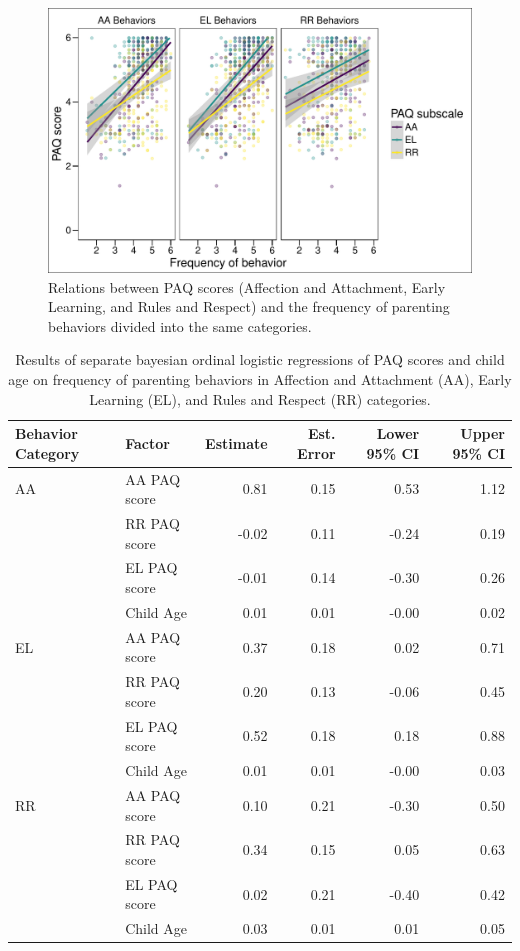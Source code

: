 \documentclass[floatsintext,man]{apa6}
\theoremstyle{definition}
\theoremstyle{definition}
\theoremstyle{definition}
\theoremstyle{remark}
\begin{document}
\begin{figure}
\centering
\includegraphics{PAQ_paper_files/figure-latex/behavepaq-1.pdf}
\caption{\label{fig:behavepaq}Relations between PAQ scores (Affection and
Attachment, Early Learning, and Rules and Respect) and the frequency of
parenting behaviors divided into the same categories.}
\end{figure}

\begin{table}[h]
\centering
\caption{Results of separate bayesian ordinal logistic regressions of PAQ scores and child age on frequency of parenting behaviors in Affection and Attachment (AA), Early Learning (EL), and Rules and Respect (RR) categories.} 
\label{tab:behavetab}
\begin{tabular}{llrrrr}
  \hline
Behavior Category & Factor & Estimate & Est. Error & Lower 95\% CI & Upper 95\% CI \\ 
  \hline
AA & AA PAQ score & 0.81 & 0.15 & 0.53 & 1.12 \\ 
   & RR PAQ score & -0.02 & 0.11 & -0.24 & 0.19 \\ 
   & EL PAQ score & -0.01 & 0.14 & -0.30 & 0.26 \\ 
   & Child Age & 0.01 & 0.01 & -0.00 & 0.02 \\ 
   \hline
EL & AA PAQ score & 0.37 & 0.18 & 0.02 & 0.71 \\ 
   & RR PAQ score & 0.20 & 0.13 & -0.06 & 0.45 \\ 
   & EL PAQ score & 0.52 & 0.18 & 0.18 & 0.88 \\ 
   & Child Age & 0.01 & 0.01 & -0.00 & 0.03 \\ 
   \hline
RR & AA PAQ score & 0.10 & 0.21 & -0.30 & 0.50 \\ 
   & RR PAQ score & 0.34 & 0.15 & 0.05 & 0.63 \\ 
   & EL PAQ score & 0.02 & 0.21 & -0.40 & 0.42 \\ 
   & Child Age & 0.03 & 0.01 & 0.01 & 0.05 \\ 
   \hline
\end{tabular}
\end{table}
\end{document}
